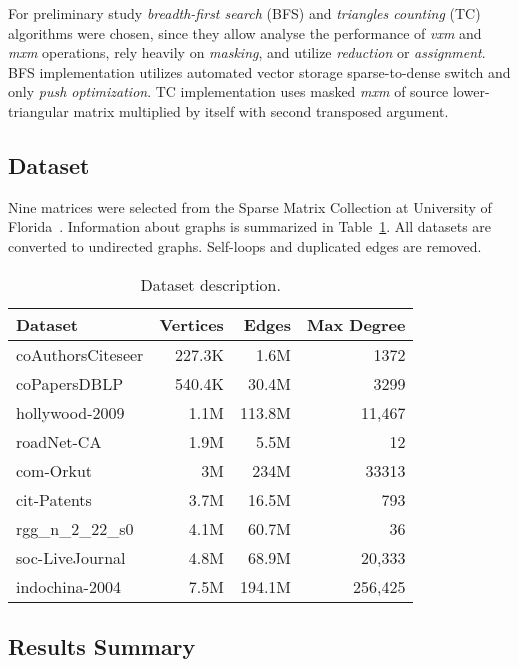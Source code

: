 For preliminary study \textit{breadth-first search} (BFS) and \textit{triangles counting} (TC) algorithms were chosen, since they allow analyse the performance of \textit{vxm} and \textit{mxm} operations, rely heavily on \textit{masking}, and utilize \textit{reduction} or \textit{assignment}. 
BFS implementation utilizes automated vector storage sparse-to-dense switch and only \textit{push optimization}. 
TC implementation uses masked \textit{mxm} of source lower-triangular matrix multiplied by itself with second transposed argument.

\subsection{Dataset}

Nine matrices were selected from the Sparse Matrix Collection at University of Florida~\cite{dataset:10.1145/2049662.2049663}. 
Information about graphs is summarized in Table~\ref{dataset:info}. 
All datasets are converted to undirected graphs. 
Self-loops and duplicated edges are removed.

\begin{table}[tbp]
\caption{Dataset description.} 
\begin{center}
    \begin{tabular}{|l|r|r|r|}
    \hline
    Dataset & Vertices  & Edges & Max Degree \\
    \hline
    \hline
    coAuthorsCiteseer & 227.3K &   1.6M &    1372 \\
    coPapersDBLP      & 540.4K &  30.4M &    3299 \\
    hollywood-2009    &   1.1M & 113.8M &  11,467 \\
    roadNet-CA        &   1.9M &   5.5M &      12 \\
    com-Orkut         &     3M &   234M &   33313 \\
    cit-Patents       &   3.7M &  16.5M &     793 \\
    rgg\_n\_2\_22\_s0 &   4.1M &  60.7M &      36 \\
    soc-LiveJournal   &   4.8M &  68.9M &  20,333 \\
    indochina-2004    &   7.5M & 194.1M & 256,425 \\
    \hline
    \end{tabular}
    \label{dataset:info}
\end{center}
\end{table}

\subsection{Results Summary}

